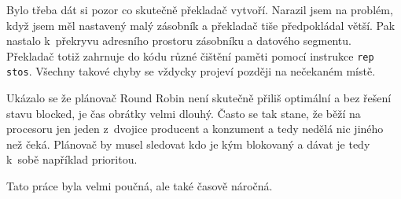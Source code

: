 \documentclass[a4paper,12pt]{article}
\begin{document}
Bylo třeba dát si pozor co skutečně překladač vytvoří. Narazil jsem na problém, když jsem
měl nastavený malý zásobník a překladač tiše předpokládal větší. Pak nastalo k~překryvu
adresního prostoru zásobníku a datového segmentu. Překladač totiž zahrnuje do kódu různé
čištění paměti pomocí instrukce \verb+rep stos+. Všechny takové chyby se vždycky projeví
později na nečekaném místě.

Ukázalo se že plánovač Round Robin není skutečně přiliš optimální a bez řešení stavu
blocked, je čas obrátky velmi dlouhý. Často se tak stane, že běží na procesoru jen jeden
z~dvojice producent a konzument a tedy nedělá nic jiného než čeká. Plánovač by musel
sledovat kdo je kým blokovaný a dávat je tedy k~sobě například prioritou.

Tato práce byla velmi poučná, ale také časově náročná.
\end{document}
